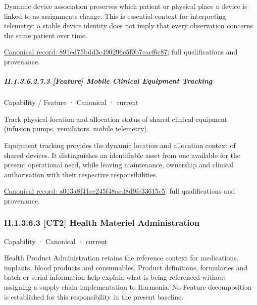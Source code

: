 Dynamic device association preserves which patient or physical place a device is linked to as assignments change. This is essential context for interpreting telemetry: a stable device identity does not imply that every observation concerns the same patient over time.


{\footnotesize \href{../../../../continuum/strategy/capability/feature/891ed75bdd3c490296e5f0b7cacf6c87.md}{Canonical record: 891ed75bdd3c490296e5f0b7cacf6c87}; full qualifications and provenance.}\par
\subparagraph*{II.1.3.6.2.7.3 [Feature] Mobile Clinical Equipment Tracking}
\label{navigation:II.1.3.6.2.7.3}

\label{element:a013a8f41ce245f48aed8d9fe33615c5}
{\small Capability / Feature · Canonical · current}\par

Track physical location and allocation status of shared clinical equipment (infusion pumps, ventilators, mobile telemetry).



Equipment tracking provides the dynamic location and allocation context of shared devices. It distinguishes an identifiable asset from one available for the present operational need, while leaving maintenance, ownership and clinical authorisation with their respective responsibilities.


{\footnotesize \href{../../../../continuum/strategy/capability/feature/a013a8f41ce245f48aed8d9fe33615c5.md}{Canonical record: a013a8f41ce245f48aed8d9fe33615c5}; full qualifications and provenance.}\par
\subsubsection*{II.1.3.6.3 [CT2] Health Materiel Administration}
\label{navigation:II.1.3.6.3}

\label{element:e7081070a9f8444f81c1d8fce37ef664}
{\small Capability · Canonical · current}\par

Health Product Administration retains the reference context for medications, implants, blood products and consumables. Product definitions, formularies and batch or serial information help explain what is being referenced without assigning a supply-chain implementation to Harmonia. No Feature decomposition is established for this responsibility in the present baseline.



